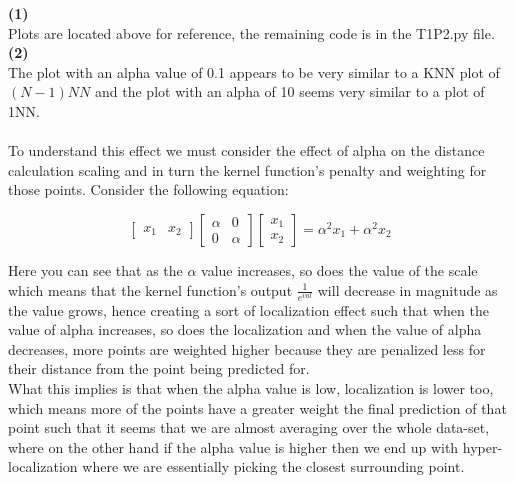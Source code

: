 \documentclass[submit]{harvardml}
\begin{document}
\begin{tcolorbox}[breakable]

\textbf{(1)}\\

Plots are located above for reference, the remaining code is in the T1P2.py file.\\

\textbf{(2)}\\

The plot with an alpha value of 0.1 appears to be very similar to a KNN plot of $(N -1)NN$ and the plot with an alpha of 10 seems very similar to a plot of 1NN.\\\\
To understand this effect we must consider the effect of alpha on the distance calculation scaling and in turn the kernel function's penalty and weighting for those points. Consider the following equation:

\begin{equation}
\begin{bmatrix}
  x_1 & x_2
 \end{bmatrix}
 \begin{bmatrix}
  \alpha & 0 \\
  0 & \alpha 
 \end{bmatrix}  
 \begin{bmatrix}
  x_1 \\
  x_2 
 \end{bmatrix} = 
  \alpha^2 x_1 + \alpha^2 x_2
\end{equation}

Here you can see that as the $\alpha$ value increases, so does the value of the scale which means that the kernel function's output $\frac{1}{e^{val}}$ will decrease in magnitude as the value grows, hence creating a sort of localization effect such that when the value of alpha increases, so does the localization and when the value of alpha decreases, more points are weighted higher because they are penalized less for their distance from the point being predicted for.\\

What this implies is that when the alpha value is low, localization is lower too, which means more of the points have a greater weight the final prediction of that point such that it seems that we are almost averaging over the whole data-set, where on the other hand if the alpha value is higher then we end up with hyper-localization where we are essentially picking the closest surrounding point.

\end{tcolorbox}
\end{document}
